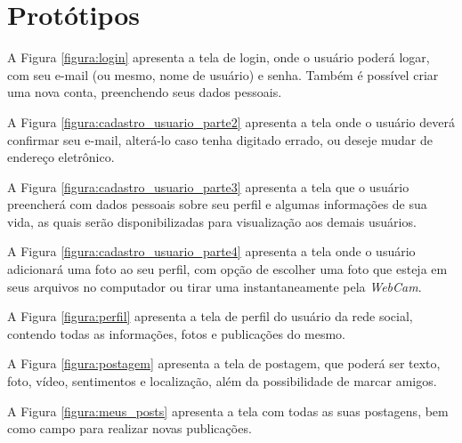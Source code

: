 \chapter{Protótipos}

A Figura \ref{figura:login} apresenta a tela de login, onde o usuário poderá logar, com seu e-mail (ou mesmo, nome de usuário) e senha. Também é possível criar uma nova conta, preenchendo seus dados pessoais.


A Figura \ref{figura:cadastro_usuario_parte2} apresenta a tela onde o usuário deverá confirmar seu e-mail, alterá-lo caso tenha digitado errado, ou deseje mudar de endereço eletrônico.


A Figura \ref{figura:cadastro_usuario_parte3} apresenta a tela que o usuário preencherá com dados pessoais sobre seu perfil e algumas informações de sua vida, as quais serão disponibilizadas para visualização aos demais usuários.


A Figura \ref{figura:cadastro_usuario_parte4} apresenta a tela onde o usuário adicionará uma foto ao seu perfil, com opção de escolher uma foto que esteja em seus arquivos no computador ou tirar uma instantaneamente pela \textit{WebCam}.


A Figura \ref{figura:perfil} apresenta a tela de perfil do usuário da rede social, contendo todas as informações, fotos e publicações do mesmo.


A Figura \ref{figura:postagem} apresenta a tela de postagem, que poderá ser texto, foto, vídeo, sentimentos e localização, além da possibilidade de marcar amigos.


A Figura \ref{figura:meus_posts} apresenta a tela com todas as suas postagens, bem como campo para realizar novas publicações.

